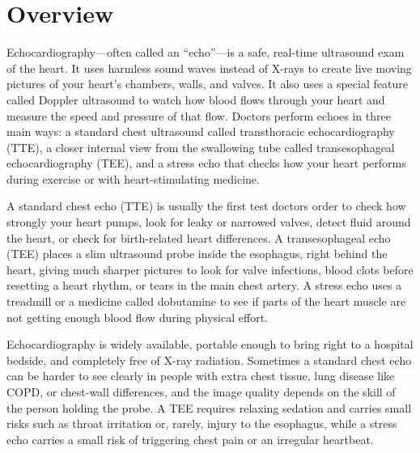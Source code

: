 \label{ch:infographic-echocardiography}

\section{Overview}

Echocardiography---often called an ``echo''---is a safe, real-time ultrasound exam of the heart. It uses harmless sound waves instead of X-rays to create live moving pictures of your heart's chambers, walls, and valves. It also uses a special feature called Doppler ultrasound to watch how blood flows through your heart and measure the speed and pressure of that flow. Doctors perform echoes in three main ways: a standard chest ultrasound called transthoracic echocardiography (TTE), a closer internal view from the swallowing tube called transesophageal echocardiography (TEE), and a stress echo that checks how your heart performs during exercise or with heart-stimulating medicine.

A standard chest echo (TTE) is usually the first test doctors order to check how strongly your heart pumps, look for leaky or narrowed valves, detect fluid around the heart, or check for birth-related heart differences. A transesophageal echo (TEE) places a slim ultrasound probe inside the esophagus, right behind the heart, giving much sharper pictures to look for valve infections, blood clots before resetting a heart rhythm, or tears in the main chest artery. A stress echo uses a treadmill or a medicine called dobutamine to see if parts of the heart muscle are not getting enough blood flow during physical effort.

Echocardiography is widely available, portable enough to bring right to a hospital bedside, and completely free of X-ray radiation. Sometimes a standard chest echo can be harder to see clearly in people with extra chest tissue, lung disease like COPD, or chest-wall differences, and the image quality depends on the skill of the person holding the probe. A TEE requires relaxing sedation and carries small risks such as throat irritation or, rarely, injury to the esophagus, while a stress echo carries a small risk of triggering chest pain or an irregular heartbeat.


